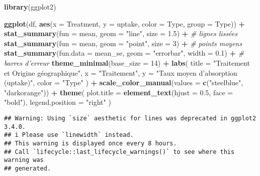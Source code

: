 \documentclass[
]{article}
\newenvironment{Shaded}{\begin{snugshade}}{\end{snugshade}}
\newcommand{\AttributeTok}[1]{\textcolor[rgb]{0.13,0.29,0.53}{#1}}
\newcommand{\CommentTok}[1]{\textcolor[rgb]{0.56,0.35,0.01}{\textit{#1}}}
\newcommand{\DecValTok}[1]{\textcolor[rgb]{0.00,0.00,0.81}{#1}}
\newcommand{\FloatTok}[1]{\textcolor[rgb]{0.00,0.00,0.81}{#1}}
\newcommand{\FunctionTok}[1]{\textcolor[rgb]{0.13,0.29,0.53}{\textbf{#1}}}
\newcommand{\NormalTok}[1]{#1}
\newcommand{\SpecialCharTok}[1]{\textcolor[rgb]{0.81,0.36,0.00}{\textbf{#1}}}
\newcommand{\StringTok}[1]{\textcolor[rgb]{0.31,0.60,0.02}{#1}}
\begin{document}
\begin{Shaded}
\begin{Highlighting}[]
\FunctionTok{library}\NormalTok{(ggplot2)}

\FunctionTok{ggplot}\NormalTok{(df, }\FunctionTok{aes}\NormalTok{(}\AttributeTok{x =}\NormalTok{ Treatment, }\AttributeTok{y =}\NormalTok{ uptake, }\AttributeTok{color =}\NormalTok{ Type, }\AttributeTok{group =}\NormalTok{ Type)) }\SpecialCharTok{+}
  \FunctionTok{stat\_summary}\NormalTok{(}\AttributeTok{fun =}\NormalTok{ mean, }\AttributeTok{geom =} \StringTok{"line"}\NormalTok{, }\AttributeTok{size =} \FloatTok{1.5}\NormalTok{) }\SpecialCharTok{+}               \CommentTok{\# lignes lissées}
  \FunctionTok{stat\_summary}\NormalTok{(}\AttributeTok{fun =}\NormalTok{ mean, }\AttributeTok{geom =} \StringTok{"point"}\NormalTok{, }\AttributeTok{size =} \DecValTok{3}\NormalTok{) }\SpecialCharTok{+}                \CommentTok{\# points moyens}
  \FunctionTok{stat\_summary}\NormalTok{(}\AttributeTok{fun.data =}\NormalTok{ mean\_se, }\AttributeTok{geom =} \StringTok{"errorbar"}\NormalTok{, }\AttributeTok{width =} \FloatTok{0.1}\NormalTok{) }\SpecialCharTok{+}  \CommentTok{\# barres d’erreur}
  \FunctionTok{theme\_minimal}\NormalTok{(}\AttributeTok{base\_size =} \DecValTok{14}\NormalTok{) }\SpecialCharTok{+}
  \FunctionTok{labs}\NormalTok{(}
    \AttributeTok{title =} \StringTok{"Traitement et Origine géographique"}\NormalTok{,}
    \AttributeTok{x =} \StringTok{"Traitement"}\NormalTok{,}
    \AttributeTok{y =} \StringTok{"Taux moyen d’absorption (uptake)"}\NormalTok{,}
    \AttributeTok{color =} \StringTok{"Type"}
\NormalTok{  ) }\SpecialCharTok{+}
  \FunctionTok{scale\_color\_manual}\NormalTok{(}\AttributeTok{values =} \FunctionTok{c}\NormalTok{(}\StringTok{"steelblue"}\NormalTok{, }\StringTok{"darkorange"}\NormalTok{)) }\SpecialCharTok{+}
  \FunctionTok{theme}\NormalTok{(}
    \AttributeTok{plot.title =} \FunctionTok{element\_text}\NormalTok{(}\AttributeTok{hjust =} \FloatTok{0.5}\NormalTok{, }\AttributeTok{face =} \StringTok{"bold"}\NormalTok{),}
    \AttributeTok{legend.position =} \StringTok{"right"}
\NormalTok{  )}
\end{Highlighting}
\end{Shaded}

\begin{verbatim}
## Warning: Using `size` aesthetic for lines was deprecated in ggplot2 3.4.0.
## i Please use `linewidth` instead.
## This warning is displayed once every 8 hours.
## Call `lifecycle::last_lifecycle_warnings()` to see where this warning was
## generated.
\end{verbatim}
\end{document}
